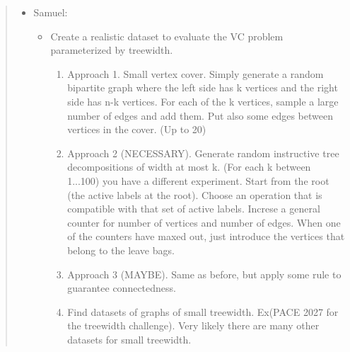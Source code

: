 \begin{abstract}
\begin{itemize}
    \item Samuel: 
    \begin{itemize}
        \item Create a realistic dataset to evaluate the VC problem parameterized by treewidth.
        \begin{enumerate}
            \item Approach 1. Small vertex cover. Simply generate a random bipartite graph where the left side has k vertices and the right side has n-k vertices. For each of the k vertices, sample a large number of edges and add them. Put also some edges between vertices in the cover. (Up to 20)
            \item Approach 2 (NECESSARY). Generate random instructive tree decompositions of width at most k. (For each k between 1...100) you have a different experiment. Start from the root (the active labels at the root). Choose an operation that is compatible with that set of active labels. 
            Increse a general counter for number of vertices and number of edges. When one of the counters have maxed out, just introduce the vertices that belong to the leave bags. 
            \item Approach 3 (MAYBE). Same as before, but apply some rule to guarantee connectedness. 
            \item Find datasets of graphs of small treewidth. Ex(PACE 2027 for the treewidth challenge). Very likely there are many other datasets for small treewidth. 
            
            

        \end{enumerate}
    \end{itemize}
\end{itemize}
\end{abstract}
